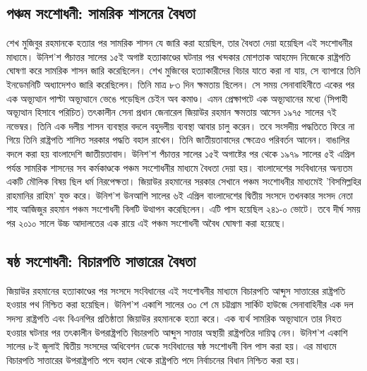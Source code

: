 \documentclass[11pt]{article}
\begin{document}
\subsection{পঞ্চম সংশোধনী: সামরিক শাসনের বৈধতা}
\label{sec:orgc20c4a1}
শেখ মুজিবুর রহমানকে হত্যার পর সামরিক শাসন যে জারি করা হয়েছিল,
তার বৈধতা দেয়া হয়েছিল এই সংশোধনীর মাধ্যমে। উনিশ'শ পঁচাত্তর
সালের ১৫ই অগাষ্ট হত্যাকাণ্ডের ঘটনার পর খন্দকার মোশতাক আহমেদ
নিজেকে রাষ্ট্রপতি ঘোষণা করে সামরিক শাসন জারি করেছিলেন। শেখ
মুজিবের হত্যাকারীদের বিচার যাতে করা না যায়, সে ব্যাপারে তিনি
ইনডেমনিটি অধ্যাদেশও জারি করেছিলেন। তিনি মাত্র ৮৩ দিন ক্ষমতায়
ছিলেন। সে সময় সেনাবাহিনীতে একের পর এক অভ্যূত্থান পাল্টা অভ্যূত্থানে
ভেঙে পড়েছিল চেইন অব কমাণ্ড। এমন প্রেক্ষাপটে এক অভ্যূত্থানের মধ্যে
(সিপাহী অভ্যূত্থান হিসাবে পরিচিত) তৎকালীন সেনা প্রধান জেনারেল
জিয়াউর রহমান ক্ষমতায় আসেন ১৯৭৫ সালের ৭ই নভেম্বর। তিনি এক দলীয়
শাসন ব্যবস্থার বদলে বহুদলীয় ব্যবস্থা আবার চালু করেন। তবে সংসদীয়
পদ্ধতিতে ফিরে না গিয়ে তিনি রাষ্ট্রপতি শাসিত সরকার পদ্ধতি বহাল
রাখেন। তিনি জাতীয়তাবাদের ক্ষেত্রেও পরিবর্তন আনেন। বাঙালির বদলে
করা হয় বাংলাদেশি জাতীয়তাবাদ। উনিশ'শ পঁচাত্তর সালের ১৫ই অগাষ্টের
পর থেকে ১৯৭৯ সালের ৫ই এপ্রিল পর্যন্ত সামরিক শাসনের সব কর্মকাণ্ডকে
পঞ্চম সংশোধনীর মাধ্যমে বৈধতা দেয়া হয়। বাংলাদেশের সংবিধানের
অন্যতম একটি মৌলিক বিষয় ছিল ধর্ম নিরপেক্ষতা। জিয়াউর রহমানের
সরকার সেখানে পঞ্চম সংশোধনীর মাধ্যমেই 'বিসমিল্লহির রাহমানির
রাহিম' যুক্ত করে। উনিশ'শ উনআশি সালের ৬ই এপ্রিল বাংলাদেশের
দ্বিতীয় সংসদে তখনকার সংসদ নেতা শাহ আজিজুর রহমান পঞ্চম সংশোধনী
বিলটি উত্থাপন করেছিলেন। এটি পাস হয়েছিল ২৪১-০ ভোটে। তবে দীর্ঘ
সময় পর ২০১০ সালে উচ্চ আদালতের এক রায়ে এই পঞ্চম সংশোধনী অবৈধ
ঘোষণা করা হয়েছে।



\subsection{ষষ্ঠ সংশোধনী: বিচারপতি সাত্তারের বৈধতা}
\label{sec:org4c00eaa}
জিয়াউর রহমানের হত্যাকাণ্ডের পর সংসদে সংবিধানের এই সংশোধনীর
মাধ্যমে বিচারপতি আব্দুস সাত্তারের রাষ্ট্রপতি হওয়ার পথ নিশ্চিত করা
হয়েছিল। উনিশ'শ একাশি সালের ৩০ শে মে চট্টগ্রাম সার্কিট হাউজে
সেনাবাহিনীর এক দল সদস্য রাষ্ট্রপতি এবং বিএনপির প্রতিষ্ঠাতা জিয়াউর
রহমানকে হত্যা করে। এক ব্যর্থ সামরিক অভ্যূত্থানে তার নিহত হওয়ার
ঘটনার পর তৎকালীন উপরাষ্ট্রপতি বিচারপতি আব্দুস সাত্তার অস্থায়ী
রাষ্ট্রপতির দায়িত্ব নেন। উনিশ'শ একাশি সালের ৮ই জুলাই দ্বিতীয়
সংসদের অধিবেশন ডেকে সংবিধানের ষষ্ঠ সংশোধনী বিল পাস করা হয়। এর
মাধ্যমে বিচারপতি সাত্তারের উপরাষ্ট্রপতি পদে বহাল থেকে রাষ্ট্রপতি
পদে নির্বাচনের বিধান নিশ্চিত করা হয়।
\end{document}
